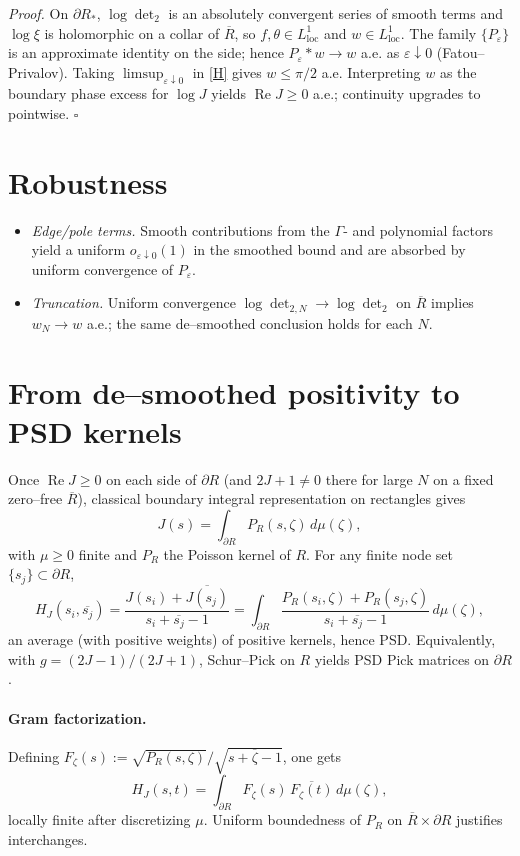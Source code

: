 \documentclass[11pt]{article}
\theoremstyle{remark}
\newcommand{\ReS}{\operatorname{Re}}
\begin{document}
\noindent\textit{Proof.} On $\partial R_*$, $\log\det_2$ is an absolutely convergent series of smooth terms and $\log\xi$ is holomorphic on a collar of $\overline R$, so $f,\theta\in L^1_{\mathrm{loc}}$ and $w\in L^1_{\mathrm{loc}}$. The family $\{P_\varepsilon\}$ is an approximate identity on the side; hence $P_\varepsilon*w\to w$ a.e. as $\varepsilon\downarrow0$ (Fatou--Privalov). Taking $\limsup_{\varepsilon\downarrow0}$ in \eqref{H} gives $w\le\pi/2$ a.e. Interpreting $w$ as the boundary phase excess for $\log J$ yields $\ReS J\ge0$ a.e.; continuity upgrades to pointwise. $\square$

\section*{Robustness}
\begin{itemize}
  \item \emph{Edge/pole terms.} Smooth contributions from the $\Gamma$- and polynomial factors yield a uniform $o_{\varepsilon\downarrow0}(1)$ in the smoothed bound and are absorbed by uniform convergence of $P_\varepsilon$.
  \item \emph{Truncation.} Uniform convergence $\log\det_{2,N}\to\log\det_2$ on $\overline R$ implies $w_N\to w$ a.e.; the same de--smoothed conclusion holds for each $N$.
\end{itemize}

\section*{From de--smoothed positivity to PSD kernels}
Once $\ReS J\ge0$ on each side of $\partial R$ (and $2J+1\ne0$ there for large $N$ on a fixed zero--free $\overline R$), classical boundary integral representation on rectangles gives
\[
J(s)=\int_{\partial R} P_R(s,\zeta)\,d\mu(\zeta),
\]
with $\mu\ge0$ finite and $P_R$ the Poisson kernel of $R$. For any finite node set $\{s_j\}\subset\partial R$,
\[
H_J(s_i,\overline{s_j})=\frac{J(s_i)+\overline{J(s_j)}}{s_i+\overline{s_j}-1}
=\int_{\partial R} \frac{P_R(s_i,\zeta)+P_R(s_j,\zeta)}{s_i+\overline{s_j}-1}\, d\mu(\zeta),
\]
an average (with positive weights) of positive kernels, hence PSD. Equivalently, with $g=(2J-1)/(2J+1)$, Schur--Pick on $R$ yields PSD Pick matrices on $\partial R$.

\paragraph{Gram factorization.} Defining $F_\zeta(s):=\sqrt{P_R(s,\zeta)}/\sqrt{s+\overline{\zeta}-1}$, one gets
\[
H_J(s,t)=\int_{\partial R} F_\zeta(s)\,\overline{F_\zeta(t)}\,d\mu(\zeta),
\]
locally finite after discretizing $\mu$. Uniform boundedness of $P_R$ on $\overline R\times\partial R$ justifies interchanges.
\end{document}
